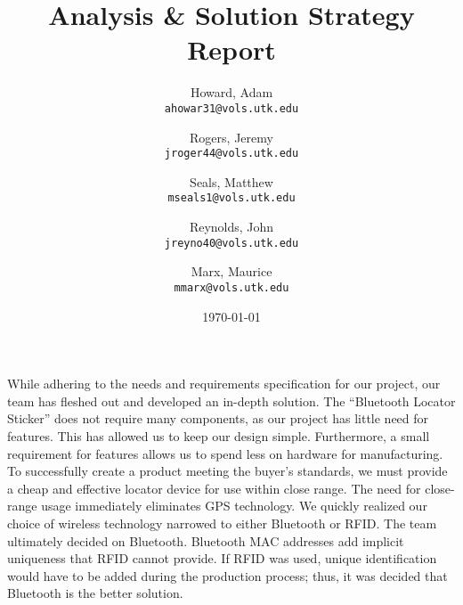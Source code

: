 \documentclass[12pt]{article}
\author{
  Howard, Adam\\
  \texttt{ahowar31@vols.utk.edu}
  \and
  Rogers, Jeremy\\
  \texttt{jroger44@vols.utk.edu}
  \and
  Seals, Matthew\\
  \texttt{mseals1@vols.utk.edu}
  \and
  Reynolds, John\\
  \texttt{jreyno40@vols.utk.edu}
  \and
  Marx, Maurice\\
  \texttt{mmarx@vols.utk.edu}
}
\title{Analysis \& Solution Strategy Report}
\date{\today}
\begin{document}
  \maketitle
  \pagebreak
  \vspace{16 pt}

  While adhering to the needs and requirements specification for our project, our team has fleshed out and
  developed an in-depth solution. The ``Bluetooth Locator Sticker'' does not require many components, as our
  project has little need for features. This has allowed us to keep our design simple. Furthermore, a small
  requirement for features allows us to spend less on hardware for manufacturing. To successfully create a 
  product meeting the buyer's standards, we must provide a cheap and effective locator device for use within
  close range. The need for close-range usage immediately eliminates GPS technology. We quickly realized our
  choice of wireless technology narrowed to either Bluetooth or RFID. The team ultimately decided on Bluetooth.
  Bluetooth MAC addresses add implicit uniqueness that RFID cannot provide. If RFID was used, unique
  identification would have to be added during the production process; thus, it was decided that Bluetooth
  is the better solution.

  \vspace{16 pt}
\end{document}

